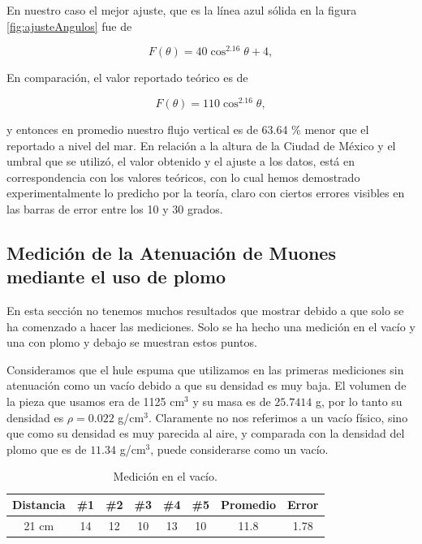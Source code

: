 \documentclass[a4paper,10pt]{article}
\numberwithin{equation}{section}
\begin{document}
\vspace{.3cm}

En nuestro caso el mejor ajuste, que es la línea azul sólida en la
figura \eqref{fig:ajusteAngulos} fue de 

\begin{equation}
  F(\theta) = 40\cos^{2.16}{\theta} + 4 ,
\end{equation}

En comparación, el valor reportado teórico es de 

\begin{equation}
  F(\theta) = 110\cos^{2.16}{\theta},
\end{equation}

y entonces en promedio nuestro flujo vertical es de 63.64 \% menor que el reportado
a nivel del mar. En relación a la altura de la Ciudad de México y el umbral que se 
utilizó, el valor obtenido y el ajuste a los datos, está en correspondencia con los 
valores teóricos, con lo cual hemos demostrado experimentalmente lo predicho por la teoría, claro 
con ciertos errores visibles en las barras de error entre los 10 y 30 grados.


\subsection{Medición de la Atenuación de Muones mediante el uso de plomo}

En esta sección no tenemos muchos resultados que mostrar debido a que solo se ha 
comenzado a hacer las mediciones. Solo se ha hecho una medición en el vacío y 
una con plomo y debajo se muestran estos puntos.

\vspace{.3cm}

Consideramos que el hule espuma que utilizamos en las primeras mediciones sin atenuación  como  un vacío debido a que su densidad es muy baja. El volumen de la 
pieza que usamos era de 1125 cm$^3$ y su masa es de $25.7414$ g, por lo tanto 
su densidad es $\rho = 0.022$ g/cm$^3$. Claramente no nos referimos a un vacío 
físico, sino que como su densidad es muy parecida al aire, y comparada con la 
densidad del plomo que es de $11.34$ g/cm$^3$, puede considerarse como un vacío.

\begin{table}[H]
\centering
\caption{Medición en el vacío.}
\begin{tabular}{|c|c|c|c|c|c|c|c|}
\hline 
Distancia & \#1 & \#2 & \#3 & \#4 & \#5 & Promedio & Error \\ 
\hline 
21 cm & 14 & 12 & 10 & 13 & 10 & 11.8 &  1.78 \\ 
\hline 
\end{tabular}
\end{table}
\end{document}
